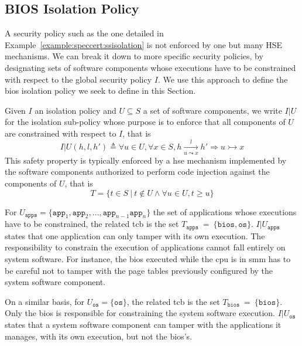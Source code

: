 \subsection{BIOS Isolation Policy}
\label{subsec:speccert:biossec}

A security policy such as the one detailed in
Example~\ref{example:speccert:ssisolation} is not enforced by one but many HSE
mechanisms.
%
We can break it down to more specific security policies, by designating sets of
software components whose executions have to be constrained with respect to the
global security policy $I$.
%
We use this approach to define the \ac{bios} isolation policy we seek to define
in this Section.

\begin{definition}
  \label{def:speccert:partial}
  Given $I$ an isolation policy and $U \subseteq S$ a set of software
  components, we write $I|U$ for the isolation sub-policy whose purpose is to
  enforce that all components of $U$ are constrained with respect to $I$, that
  is
  \[
    I|U(h, l, h') \triangleq \forall u \in U, \forall x \in S, h \xrightarrow[u
    \leadsto x]{l} h' \Rightarrow u \rightarrowtail x
  \]
  This safety property is typically enforced by a \ac{hse} mechanism implemented
  by the software components authorized to perform code injection against the
  components of $U$, that is
  \[
    T = \{ t \in S\ |\ t \not\in U \wedge \forall u \in U, t \ge u \}
  \]
\end{definition}

\begin{example}[Sharing of Responsibility]
  For
  $U_{\mathtt{apps}} = \{ \mathtt{app}_1, \mathtt{app}_2, \ldots,
  \mathtt{app}_{n-1} \mathtt{app}_{n} \}$ the set of applications whose
  executions have to be constrained, the related \ac{tcb} is the set
  $T_{\mathtt{apps}}~=~\{ \mathtt{bios}, \mathtt{os} \}$.
  $I|U_{\mathtt{apps}}$ states that one application can only tamper with its own
  execution.
  The responsibility to constrain the execution of applications cannot fall
  entirely on system software.
  For instance, the \ac{bios} executed while the \ac{cpu} is in \ac{smm} has to
  be careful not to tamper with the page tables previously configured by the
  system software component.

  On a similar basis, for $U_{\mathtt{os}} = \{ \mathtt{os} \}$, the related
  \ac{tcb} is the set $T_{\mathtt{bios}}~=~\{ \mathtt{bios} \}$.
  Only the \ac{bios} is responsible for constraining the system software
  execution.
  $I|U_{\mathtt{os}}$ states that a system software component can tamper with
  the applications it manages, with its own execution, but not the \ac{bios}'s.
\end{example}

